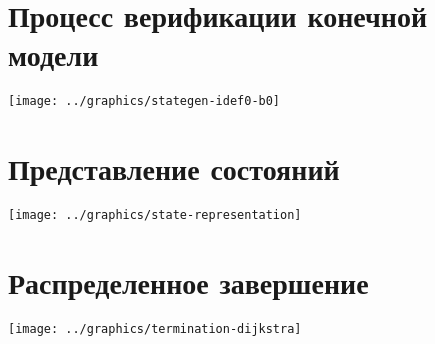 \documentclass[12pt]{article}
\begin{document}





\section{Процесс верификации конечной модели}
\label{sec:idef0}

\begin{center}
  \texttt{[image: ../graphics/stategen-idef0-b0]}
\end{center}

\section{Представление состояний}
\label{sec:state-represent}

\begin{center}
  \texttt{[image: ../graphics/state-representation]}
\end{center}

\section{Распределенное завершение}
\label{sec:distributed-termination}

\begin{center}
  \texttt{[image: ../graphics/termination-dijkstra]}
\end{center}
\end{document}
